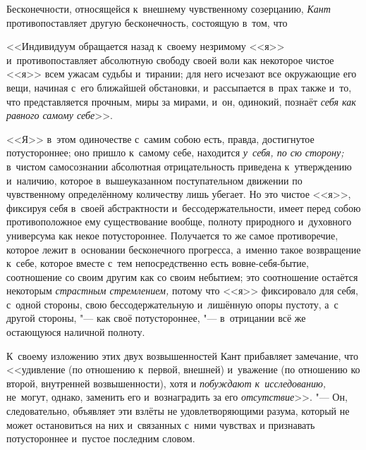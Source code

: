 Бесконечности, относящейся к~внешнему чувственному созерцанию, {\em Кант}
противопоставляет другую бесконечность, состоящую в~том, что

<<Индивидуум обращается назад к~своему незримому <<я>> и~противопоставляет
абсолютную свободу своей воли как некоторое чистое <<я>> всем ужасам судьбы
и~тирании; для него исчезают все окружающие его вещи, начиная с~его ближайшей
обстановки, и~рассыпается в~прах также и~то, что представляется прочным, миры
за мирами, и~он, одинокий, познаёт {\em себя как равного самому себе}>>.

<<Я>> в~этом одиночестве с~самим собою есть, правда, достигнутое потустороннее;
оно пришло к~самому себе, находится {\em у~себя, по сю сторону;} в~чистом
самосознании абсолютная отрицательность приведена к~утверждению и~наличию,
которое в~вышеуказанном поступательном движении по чувственному определённому
количеству лишь убегает. Но это чистое <<я>>, фиксируя себя в~своей
абстрактности и~бессодержательности, имеет перед собою противоположное ему
существование вообще, полноту природного и~духовного универсума как некое
потустороннее. Получается то же самое противоречие, которое лежит в~основании
бесконечного прогресса, а~именно такое возвращение к~себе, которое вместе с~тем
непосредственно есть вовне-себя-бытие, соотношение со своим другим как со своим
небытием; это соотношение остаётся некоторым {\em страстным стремлением,}
потому что <<я>> фиксировало для себя, с~одной стороны, свою бессодержательную
и~лишённую опоры пустоту, а~с другой стороны, "--- как своё потустороннее, "---
в~отрицании всё же остающуюся наличной полноту.

К~своему изложению этих двух возвышенностей Кант прибавляет замечание, что
<<удивление (по отношению к~первой, внешней) и~уважение (по отношению ко
второй, внутренней возвышенности), хотя и {\em побуждают к~исследованию,}
не~могут, однако, заменить его и~вознаградить за его
{\em отсутствие}>>. "--- Он, следовательно, объявляет эти взлёты не удовлетворяющими
разума, который не может остановиться на них и~связанных с~ними чувствах и
признавать потустороннее и~пустое последним словом.

